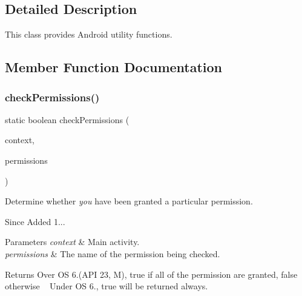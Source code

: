 \subsection{Detailed Description}
This class provides Android utility functions. 

\subsection{Member Function Documentation}
\mbox{\label{classcom_1_1toast_1_1android_1_1gamebase_1_1_gamebase_1_1_util_ae5164823a25529a8125f7cf5f974c609}} 
\subsubsection{\texorpdfstring{check\+Permissions()}{checkPermissions()}}
{\footnotesize\ttfamily static boolean check\+Permissions (\begin{DoxyParamCaption}\item[{@Non\+Null Context}]{context,  }\item[{@Non\+Null List$<$ String $>$}]{permissions }\end{DoxyParamCaption})\hspace{0.3cm}{\ttfamily [static]}}



Determine whether {\itshape you} have been granted a particular permission. 

\begin{DoxySince}{Since}
Added 1... 
\end{DoxySince}

\begin{DoxyParams}{Parameters}
{\em context} & Main activity. \\
\hline
{\em permissions} & The name of the permission being checked. \\
\hline
\end{DoxyParams}
\begin{DoxyReturn}{Returns}
Over OS 6.(A\+PI 23, M), true if all of the permission are granted, false otherwise ~\newline
 Under OS 6., true will be returned always. 
\end{DoxyReturn}
\mbox{\label{classcom_1_1toast_1_1android_1_1gamebase_1_1_gamebase_1_1_util_afa6d3ce6e5b0a271f6d120e6b616f97c}} 
